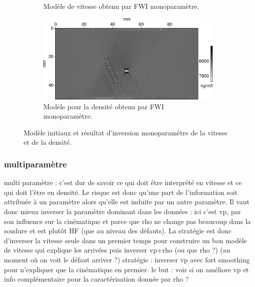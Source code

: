 \begin{figure}[!h]
\begin{subfigure}[b]{0.45\textwidth}
		\caption{Modèle de vitesse obtenu par FWI monoparamètre.}
	\end{subfigure}
	\begin{subfigure}[b]{0.45\textwidth}
		\includegraphics[width=\textwidth]{img/mono_param/rho_mono.png}
		\caption{Modèle pour la densité obtenu par FWI monoparamètre. }
	\end{subfigure}
	\caption{\label{app:inv_mono} Modèle initiaux et résultat d'inversion monoparamètre de la vitesse et de la densité.}
\end{figure}





\subsubsection{multiparamètre}



multi paramètre  : c'est dur de savoir ce qui doit être interprété en vitesse et ce qui doit l'être en densité. Le risque est donc qu'une part de l'information soit attribuée à un paramètre alors qu'elle est induite par un autre paramètre. Il vaut donc mieux inverser la paramètre dominant dans les données : ici c'est vp, par son influence sur la cinématique et parce que rho ne change pas beaucoup dans la soudure et est plutôt HF (que au niveau des défauts). La stratégie est donc d'inverser la vitesse seule dans un premier temps pour construire un bon modèle de vitesse qui explique les arrivées puis inverser vp+rho (ou que rho ?) (au moment où on voit le défaut arriver ?)
stratégie : inverser vp avec fort smoothing pour n'expliquer que la cinématique en premier.
le but : voir si on améliore vp et info complémentaire pour la caractérisation donnée par rho ?


